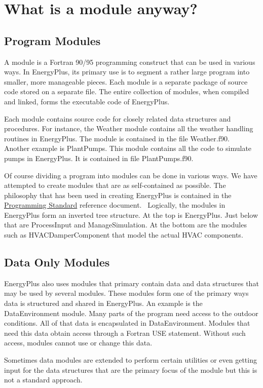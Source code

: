 \section{What is a module anyway?}\label{what-is-a-module-anyway}

\subsection{Program Modules}\label{program-modules}

A module is a Fortran 90/95 programming construct that can be used in various ways. In EnergyPlus, its primary use is to segment a rather large program into smaller, more manageable pieces. Each module is a separate package of source code stored on a separate file. The entire collection of modules, when compiled and linked, forms the executable code of EnergyPlus.

Each module contains source code for closely related data structures and procedures. For instance, the Weather module contains all the weather handling routines in EnergyPlus. The module is contained in the file Weather.f90.~ Another example is PlantPumps. This module contains all the code to simulate pumps in EnergyPlus. It is contained in file PlantPumps.f90.

Of course dividing a program into modules can be done in various ways. We have attempted to create modules that are as self-contained as possible. The philosophy that has been used in creating EnergyPlus is contained in the \href{file:///E:/Docs4PDFs/ProgrammingStandards.pdf}{Programming Standard} reference document.~ Logically, the modules in EnergyPlus form an inverted tree structure. At the top is EnergyPlus. Just below that are ProcessInput and ManageSimulation. At the bottom are the modules such as HVACDamperComponent that model the actual HVAC components.

\subsection{Data Only Modules}\label{data-only-modules}

EnergyPlus also uses modules that primary contain data and data structures that may be used by several modules. These modules form one of the primary ways data is structured and shared in EnergyPlus. An example is the DataEnvironment module. Many parts of the program need access to the outdoor conditions. All of that data is encapsulated in DataEnvironment. Modules that need this data obtain access through a Fortran USE statement. Without such access, modules cannot use or change this data.

Sometimes data modules are extended to perform certain utilities or even getting input for the data structures that are the primary focus of the module but this is not a standard approach.

